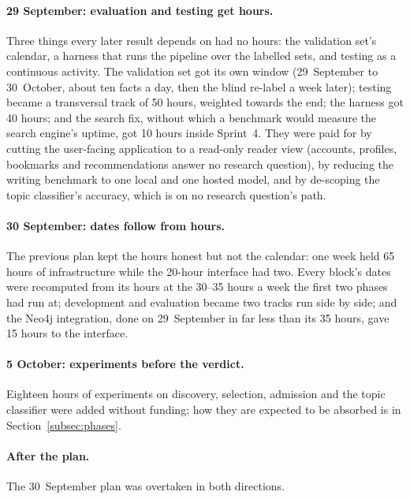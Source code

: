\paragraph{29 September: evaluation and testing get hours.} Three
things every later result depends on had no hours: the validation set's
calendar, a harness that runs the pipeline over the labelled sets, and
testing as a continuous activity. The validation set got its own
window (29~September to 30~October, about ten facts a day, then the
blind re-label a week later); testing became a transversal track of 50
hours, weighted towards the end; the harness got 40 hours; and the
search fix, without which a benchmark would measure the search engine's
uptime, got 10 hours inside Sprint~4. They were paid for by cutting the
user-facing application to a read-only reader view (accounts, profiles,
bookmarks and recommendations answer no research question), by
reducing the writing benchmark to one local and one hosted model, and
by de-scoping the topic classifier's accuracy, which is on no research
question's path.

\paragraph{30 September: dates follow from hours.} The previous plan
kept the hours honest but not the calendar: one week held 65 hours of
infrastructure while the 20-hour interface had two. Every block's dates
were recomputed from its hours at the 30--35 hours a week the first two
phases had run at; development and evaluation became two tracks run
side by side; and the Neo4j integration, done on 29~September in far
less than its 35 hours, gave 15 hours to the interface.

\paragraph{5 October: experiments before the verdict.} Eighteen hours
of experiments on discovery, selection, admission and the topic
classifier were added without funding; how they are expected to be
absorbed is in Section~\ref{subsec:phases}.

\paragraph{After the plan.} The 30~September plan was overtaken in both
directions.

